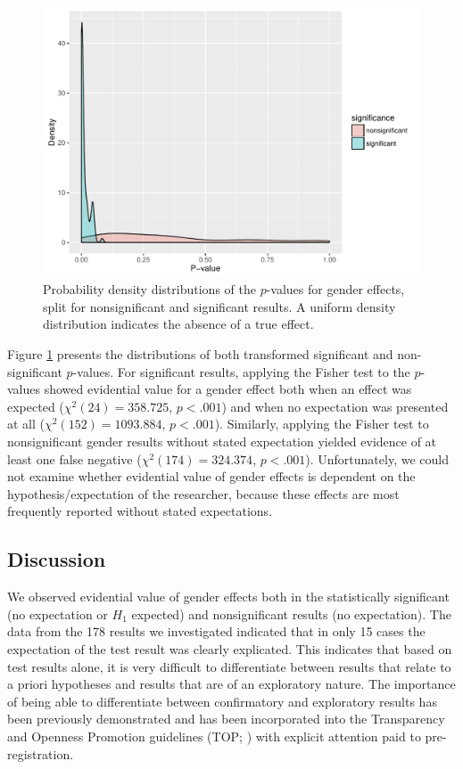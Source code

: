 \documentclass{article}
\begin{document}
\begin{figure}
\begin{center}
\includegraphics{../figures/Fig6.pdf}
\end{center}
\caption{Probability density distributions of the $p$-values for gender effects, split for nonsignificant and significant results. A uniform density distribution indicates the absence of a true effect.}
\label{fig:fig6}
\end{figure}

Figure \ref{fig:fig6} presents the distributions of both transformed significant and non-significant $p$-values. For significant results, applying the Fisher test to the $p$-values showed evidential value for a gender effect both when an effect was expected ($\chi^2(24)=358.725$, $p<.001$) and when no expectation was presented at all ($\chi^2(152)=1093.884$, $p<.001$). Similarly, applying the Fisher test to nonsignificant gender results without stated expectation yielded evidence of at least one false negative ($\chi^2(174)=324.374$, $p<.001$). Unfortunately, we could not examine whether evidential value of gender effects is dependent on the hypothesis/expectation of the researcher, because these effects are most frequently reported without stated expectations. 

\subsection*{Discussion}

We observed evidential value of gender effects both in the statistically significant (no expectation or $H_1$ expected) and nonsignificant results (no expectation). The data from the 178 results we investigated indicated that in only 15 cases the expectation of the test result was clearly explicated. This indicates that based on test results alone, it is very difficult to differentiate between results that relate to a priori hypotheses and results that are of an exploratory nature. The importance of being able to differentiate between confirmatory and exploratory results has been previously demonstrated \cite{Wagenmakers2012-jq} and has been incorporated into the Transparency and Openness Promotion guidelines (TOP; \cite{Nosek2015-nr}) with explicit attention paid to pre-registration.
\end{document}
